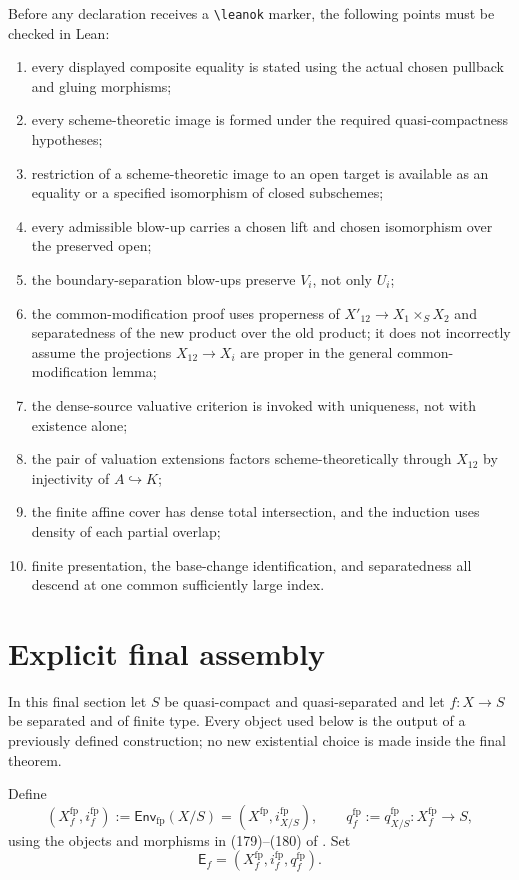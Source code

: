 Before any declaration receives a \verb|\leanok| marker, the following points
must be checked in Lean:
\begin{enumerate}
  \item every displayed composite equality is stated using the actual chosen
    pullback and gluing morphisms;
  \item every scheme-theoretic image is formed under the required
    quasi-compactness hypotheses;
  \item restriction of a scheme-theoretic image to an open target is available
    as an equality or a specified isomorphism of closed subschemes;
  \item every admissible blow-up carries a chosen lift and chosen isomorphism
    over the preserved open;
  \item the boundary-separation blow-ups preserve $V_i$, not only $U_i$;
  \item the common-modification proof uses properness of
    $X'_{12}\to X_1\times_SX_2$ and separatedness of the new product over the
    old product; it does not incorrectly assume the projections
    $X_{12}\to X_i$ are proper in the general common-modification lemma;
  \item the dense-source valuative criterion is invoked with uniqueness, not
    with existence alone;
  \item the pair of valuation extensions factors scheme-theoretically through
    $X_{12}$ by injectivity of $A\hookrightarrow K$;
  \item the finite affine cover has dense total intersection, and the induction
    uses density of each partial overlap;
  \item finite presentation, the base-change identification, and separatedness
    all descend at one common sufficiently large index.
\end{enumerate}

\section{Explicit final assembly}

In this final section let $S$ be quasi-compact and quasi-separated and let
$f\colon X\to S$ be separated and of finite type.  Every object used below is
the output of a previously defined construction; no new existential choice is
made inside the final theorem.

\begin{definition}
  \label{def:nagata-final-fp-envelope}
  \checked\lean{}

  Define
  \[
    (X_f^{\mathrm{fp}},i_f^{\mathrm{fp}})
      :=\mathsf{Env}_{\mathrm{fp}}(X/S)
      =(X^{\mathrm{fp}},i^{\mathrm{fp}}_{X/S}),
    \qquad
    q_f^{\mathrm{fp}}
      :=q^{\mathrm{fp}}_{X/S}
      \colon X_f^{\mathrm{fp}}\longrightarrow S,
  \]
  using the objects and morphisms in (179)--(180) of
  .  Set
  \[
    \mathsf E_f
      =(X_f^{\mathrm{fp}},i_f^{\mathrm{fp}},q_f^{\mathrm{fp}}).
  \]
\end{definition}

